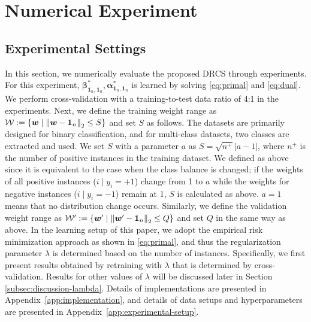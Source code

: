 
\section{Numerical Experiment}\label{sec:experiment}
\subsection{Experimental Settings}\label{subsec:exp-settings}
	In this section, we numerically evaluate the proposed DRCS through experiments.
	For this experiment, $\bm \beta_{\bm 1_n, \bm 1_n}^{*}, \bm \alpha_{\bm 1_n, \bm 1_n}^{*}$ is learned by solving \eqref{eq:primal} and \ref{eq:dual}.
	We perform cross-validation with a training-to-test data ratio of 4:1 in the experiments.
	Next, we define the training weight range as ${\cal W} := \left\{ \bm w \mid \left\|\bm w - \bm 1_n\right\|_2\leq S \right\}$ and set $S$ as follows.
	The datasets are primarily designed for binary classification, and for multi-class datasets, two classes are extracted and used.
	We set $S$ with a parameter $a$ as $S = \sqrt{n^+}|a - 1|$, where $n^+$ is the number of positive instances in the training dataset. We defined as above since it is equivalent to the case when the class balance is changed; if the weights of all positive instances (${i \mid y_i = +1}$) change from 1 to $a$ while the weights for negative instances (${i \mid y_i = -1}$) remain at 1, $S$ is calculated as above. $a = 1$ means that no distribution change occurs.
	Similarly, we define the validation weight range as ${\cal W}' := \left\{ \bm w' \mid \left\|\bm w' - \bm 1_n\right\|_2\leq Q \right\}$ and set $Q$ in the same way as above.
	In the learning setup of this paper, we adopt the empirical risk minimization approach as shown in \eqref{eq:primal}, and thus the regularization parameter $\lambda$ is determined based on the number of instances.
	Specifically, we first present results obtained by retraining with $\lambda$ that is determined by cross-validation. Results for other values of $\lambda$ will be discussed later in Section \ref{subsec:discussion-lambda}.
	Details of implementations are presented in Appendix~\ref{app:implementation}, and details of data setups and hyperparameters are presented in Appendix~\ref{app:experimental-setup}.


